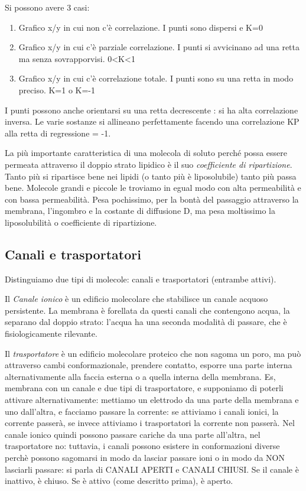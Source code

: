 \documentclass[a4paper,12pt]{article}
\begin{document}
Si possono avere 3 casi:
\begin{enumerate}
\item{Grafico x/y in cui non c'è correlazione. I punti sono dispersi e K=0}
\item{Grafico x/y in cui c’è parziale correlazione. I punti si avvicinano ad una retta ma senza sovrapporvisi. 0<K<1}
\item{Grafico x/y in cui c’è correlazione totale. I punti sono su una retta in modo preciso. K=1 o K=-1}
\end{enumerate} 

I punti possono anche orientarsi su una retta decrescente : si ha alta correlazione inversa. Le varie sostanze si allineano perfettamente facendo una correlazione KP alla retta di regressione = -1.

La più importante caratteristica di una molecola di soluto perché possa essere permeata attraverso il doppio strato lipidico è il suo \emph{coefficiente di ripartizione}. Tanto più si ripartisce bene nei lipidi (o tanto più è liposolubile) tanto più passa bene.
Molecole grandi e piccole le troviamo in egual modo con alta permeabilità e con bassa permeabilità. Pesa pochissimo, per la bontà del passaggio attraverso la membrana, l'ingombro e la costante di diffusione D, ma pesa moltissimo la liposolubilità o coefficiente di ripartizione.

\subsection{Canali e trasportatori}
Distinguiamo due tipi di molecole: canali e trasportatori (entrambe attivi).

Il \emph{Canale ionico} è un edificio molecolare che stabilisce un canale acquoso persistente. La membrana è forellata da questi canali che contengono acqua, la separano dal doppio strato: l'acqua ha una seconda modalità di passare, che è fisiologicamente rilevante. 

Il \emph{trasportatore} è un edificio molecolare proteico che non sagoma un poro, ma può attraverso cambi conformazionale, prendere contatto, esporre una parte interna alternativamente alla faccia esterna o a quella interna della membrana.
Es, membrana con un canale e due tipi di trasportatore, e supponiamo di poterli attivare alternativamente: mettiamo un elettrodo da una parte della membrana e uno dall'altra, e facciamo passare la corrente: se attiviamo i canali ionici, la corrente passerà, se invece attiviamo i trasportatori la corrente non passerà. Nel canale ionico quindi possono passare cariche da una parte all'altra, nel trasportatore no: tuttavia, i canali possono esistere in conformazioni diverse perchè possono sagomarsi in modo da lasciar passare ioni o in modo da NON lasciarli passare: si parla di CANALI APERTI e CANALI CHIUSI. Se il canale è inattivo, è chiuso. Se è attivo (come descritto prima), è aperto.
\end{document}
